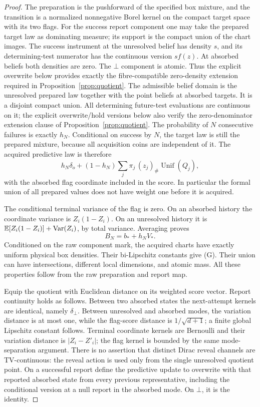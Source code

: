 \begin{proof}
The preparation is the pushforward of the specified box mixture, and the transition is a normalized nonnegative Borel kernel on the compact target space with its two flags. For the success report component one may take the prepared target law as dominating measure; its support is the compact union of the chart images. The success instrument at the unresolved belief has density $s$, and its determining-test numerator has the continuous version $s f(z)$. At absorbed beliefs both densities are zero. The $\bot$ component is atomic. Thus the explicit overwrite below provides exactly the fibre-compatible zero-density extension required in Proposition~\ref{prop:quotient}. The admissible belief domain is the unresolved prepared law together with the point beliefs at absorbed targets. It is a disjoint compact union. All determining future-test evaluations are continuous on it; the explicit overwrite/hold versions below also verify the zero-denominator extension clause of Proposition~\ref{prop:quotient}. The probability of $N$ consecutive failures is exactly $h_N$. Conditional on success by $N$, the target law is still the prepared mixture, because all acquisition coins are independent of it. The acquired predictive law is therefore
\begin{equation}\label{eq:sensor-acquired}
 h_N\delta_o+(1-h_N)\sum_j\pi_j\,(z_j)_\#\operatorname{Unif}(Q_j),
\end{equation}
with the absorbed flag coordinate included in the score. In particular the formal union of all prepared values does not have weight one before it is acquired.

The conditional terminal variance of the flag is zero. On an absorbed history the coordinate variance is $Z_i(1-Z_i)$. On an unresolved history it is
$\mathbb E[Z_i(1-Z_i)]+\operatorname{Var}(Z_i)$, by total variance. Averaging proves
\begin{equation}\label{eq:sensor-B}
 B_N=b_*+h_NV_*.
\end{equation}
Conditioned on the raw component mark, the acquired charts have exactly uniform physical box densities. Their bi-Lipschitz constants give \textup{(G)}. Their union can have intersections, different local dimensions, and atomic mass. All these properties follow from the raw preparation and report map.

Equip the quotient with Euclidean distance on its weighted score vector. Report continuity holds as follows. Between two absorbed states the next-attempt kernels are identical, namely $\delta_\bot$. Between unresolved and absorbed modes, the variation distance is at most one, while the flag-score distance is $1/\sqrt{d+1}$; a finite global Lipschitz constant follows. Terminal coordinate kernels are Bernoulli and their variation distance is $|Z_i-Z'_i|$; the flag kernel is bounded by the same mode-separation argument. There is no assertion that distinct Dirac reveal channels are TV-continuous: the reveal action is used only from the single unresolved quotient point. On a successful report define the predictive update to overwrite with that reported absorbed state from every previous representative, including the conditional version at a null report in the absorbed mode. On $\bot$, it is the identity.


\end{proof}
